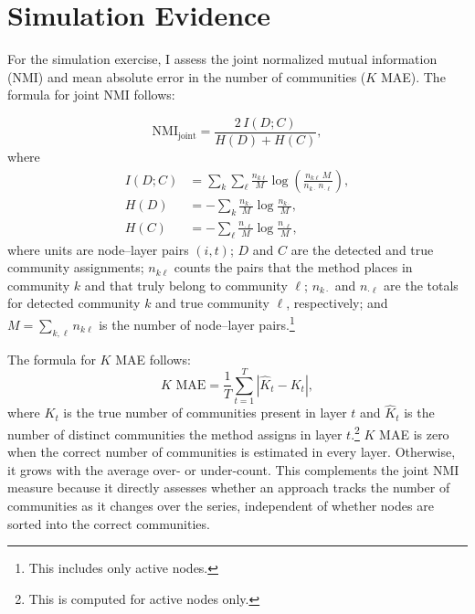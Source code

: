 \documentclass[11pt, letterpaper]{article}
\begin{document}
\section{Simulation Evidence}
For the simulation exercise, I assess the joint normalized mutual information (NMI) \citep{danon2005comparing} and mean absolute error in the number of communities ($K$ MAE). The formula for joint NMI follows: 

\begin{equation}
\mathrm{NMI}_{\text{joint}}
  = \frac{2\, I(D;C)}{H(D) + H(C)},
\end{equation}
where
\begin{align}
I(D;C) &= \sum_{k}\sum_{\ell} \frac{n_{k\ell}}{M}
          \log\!\left(\frac{n_{k\ell}\, M}{n_{k\cdot}\, n_{\cdot \ell}}\right), \\[4pt]
H(D)   &= -\sum_{k} \frac{n_{k\cdot}}{M} \log\frac{n_{k\cdot}}{M}, \\[4pt]
H(C)   &= -\sum_{\ell} \frac{n_{\cdot \ell}}{M} \log\frac{n_{\cdot \ell}}{M},
\end{align}
where units are node--layer pairs $(i,t)$; $D$ and $C$ are the detected and true community assignments; $n_{k\ell}$ counts the pairs that the method places in community $k$ and that truly belong to community $\ell$; $n_{k\cdot}$ and $n_{\cdot \ell}$ are the totals for detected community $k$ and true community $\ell$, respectively; and $M = \sum_{k,\ell} n_{k\ell}$ is the number of node--layer pairs.\footnote{This includes only active nodes.}

The formula for $K$ MAE follows:
\begin{equation}
K\text{ MAE} = \frac{1}{T} \sum_{t=1}^{T} \left| \hat{K}_t - K_t \right|,
\end{equation}
where $K_t$ is the true number of communities present in layer $t$ and $\hat{K}_t$ is the number of distinct communities the method assigns in
layer $t$.\footnote{This is computed for active nodes only.} $K$ MAE is zero when the correct number of communities is estimated in every layer. Otherwise, it grows with the average over- or under-count. This complements the joint NMI measure because it directly assesses whether an approach tracks the number of communities as it changes over the series, independent of whether nodes are sorted into the correct communities.
\end{document}
